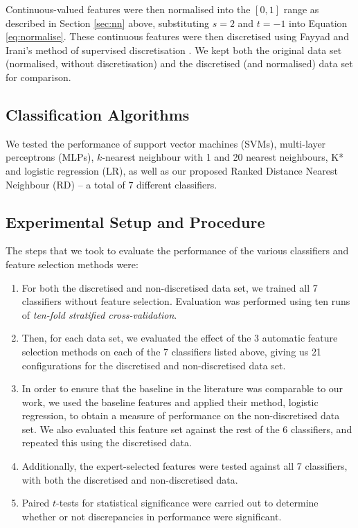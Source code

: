 \documentclass{article}
\begin{document}
Continuous-valued features were then normalised into the $[0,1]$ range as
described in Section \ref{sec:nn} above, substituting $s=2$ and $t=-1$ into
Equation \ref{eq:normalise}. These continuous features were then discretised
using Fayyad and Irani's method of supervised discretisation
\citep{Fayyad1993}. We kept both the original data set (normalised, without
discretisation) and the discretised (and normalised) data set for comparison.

\subsection{Classification Algorithms}
We tested the performance of
support vector machines (SVMs), multi-layer perceptrons (MLPs), $k$-nearest
neighbour with 1
and 20 nearest neighbours, K* and logistic regression (LR), as well as our
proposed
Ranked Distance Nearest Neighbour (RD) -- a total of 7 different classifiers.

\subsection{Experimental Setup and Procedure}
The steps that we took to evaluate the performance of the various classifiers
and feature selection methods were:
\begin{enumerate}
\item For both the discretised and non-discretised data set, we trained all 7
classifiers without feature selection. Evaluation was performed using ten runs
of \textit{ten-fold stratified cross-validation}.
\item Then, for each data set, we evaluated the effect of the 3 automatic
feature
selection methods on each of the 7 classifiers listed above, giving us 21
configurations for the discretised and non-discretised data set.
\item In order to ensure that the baseline in the literature was comparable
to our work, we used the baseline features and applied their method, logistic
regression, to obtain a measure of performance on the non-discretised data set.
We also evaluated this feature set against the rest of the 6 classifiers, and
repeated this using the discretised data.
\item Additionally, the expert-selected features were tested against all 7
classifiers, with both the discretised and non-discretised data.
\item Paired $t$-tests for statistical significance were carried out to
determine whether or not discrepancies in performance were significant.
\end{enumerate}
\end{document}
